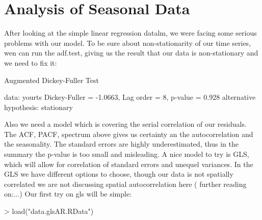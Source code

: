 \documentclass[11pt, a4paper]{article} %
\begin{document}
\section{Analysis of Seasonal Data}
After looking at the simple linear regression datalm, we were facing some serious problems with our model.
To be sure about non-stationarity of our time series, wen can run the adf.test, giving us the result that our data is non-stationary and we need to fix it:
\begin{Schunk}
\begin{Soutput}
	Augmented Dickey-Fuller Test

data:  yourts
Dickey-Fuller = -1.0663, Lag order = 8, p-value = 0.928
alternative hypothesis: stationary
\end{Soutput}
\end{Schunk}
Also we need a model which is covering the serial correlation of our residuals. The ACF, PACF, spectrum above gives us certainty an the autocorrelation and the seasonality.
The standard errors are highly underestimated, thus in the summary the p-value is too small and misleading.
A nice model to try is GLS, which will allow for correlation of standard errors and unequel variances.
In the GLS we have different options to choose, though our data is not spatially correlated we are not discussing spatial autocorrelation here ( further reading on:...)
Our first try on gls will be simple:
\begin{Schunk}
\end{Schunk}

\begin{Schunk}
\begin{Sinput}
> load("data.glsAR.RData")
\end{Sinput}
\end{Schunk}
\end{document}
